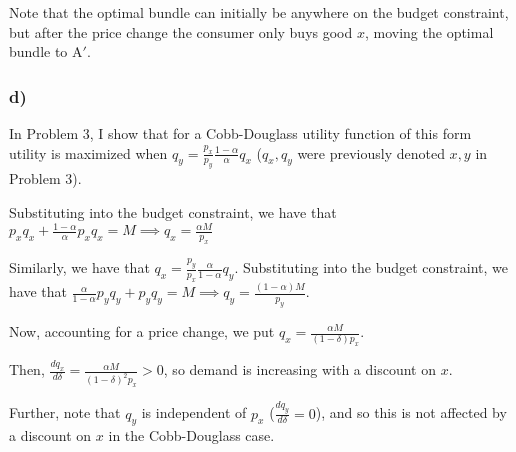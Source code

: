 \documentclass[12pt,letterpaper]{article}
\theoremstyle{definition}
\begin{document}
\begin{center}
\end{center}

Note that the optimal bundle can initially be anywhere on the budget constraint,
but after the price change the consumer only buys good $x$, moving the optimal bundle to A$'$.

\subsubsection*{d)}

In Problem 3, I show that for a Cobb-Douglass utility function of this form
utility is maximized when $q_y = \frac{p_x}{p_y}\frac{1-\alpha}{\alpha}q_x$ 
($q_x, q_y$ were previously denoted $x,y$ in Problem 3).

Substituting into the budget constraint,
we have that $p_xq_x + \frac{1-\alpha}{\alpha}p_xq_x = M
\implies q_x = \frac{\alpha M}{p_x}$

Similarly, we have that $q_x = \frac{p_y}{p_x}\frac{\alpha}{1-\alpha}q_y$.
Substituting into the budget constraint,
we have that $\frac{\alpha}{1-\alpha}p_yq_y + p_yq_y = M
\implies q_y = \frac{(1-\alpha)M}{p_y}$.

Now, accounting for a price change, we put $q_x = \frac{\alpha M}{(1-\delta)p_x}$.

Then, $\frac{dq_x}{d\delta} = \frac{\alpha M}{(1-\delta)^2p_x} > 0$,
so demand is increasing with a discount on $x$.

Further, note that $q_y$ is independent of $p_x$ ($\frac{dq_y}{d\delta} =0$), 
and so this is not affected by a discount
on $x$ in the Cobb-Douglass case.
\end{document}

